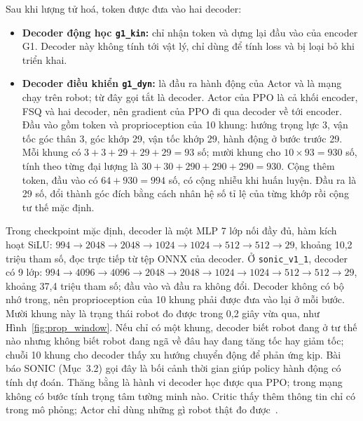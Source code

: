 \documentclass[12pt,a4paper,oneside]{report}
\newcommand{\code}[1]{\texttt{#1}}
\begin{document}
Sau khi lượng tử hoá, token được đưa vào hai decoder:
\begin{itemize}
\item \textbf{Decoder động học \code{g1\_kin}:} chỉ nhận token và dựng lại đầu vào của encoder G1. Decoder này không tính tới vật lý, chỉ dùng để tính loss và bị loại bỏ khi triển khai.
\item \textbf{Decoder điều khiển \code{g1\_dyn}:} là đầu ra hành động của Actor và là mạng chạy trên robot; từ đây gọi tắt là decoder. Actor của PPO là cả khối encoder, FSQ và hai decoder, nên gradient của PPO đi qua decoder về tới encoder. Đầu vào gồm token và proprioception của 10 khung: hướng trọng lực 3, vận tốc góc thân 3, góc khớp 29, vận tốc khớp 29, hành động ở bước trước 29. Mỗi khung có $3 + 3 + 29 + 29 + 29 = 93$ số; mười khung cho $10 \times 93 = 930$ số, tính theo từng đại lượng là $30 + 30 + 290 + 290 + 290 = 930$. Cộng thêm token, đầu vào có $64 + 930 = 994$ số, có cộng nhiễu khi huấn luyện. Đầu ra là 29 số, đổi thành góc đích bằng cách nhân hệ số tỉ lệ của từng khớp rồi cộng tư thế mặc định.
\end{itemize}

Trong checkpoint mặc định, decoder là một MLP 7 lớp nối đầy đủ, hàm kích hoạt SiLU: $994 \to 2048 \to 2048 \to 1024 \to 1024 \to 512 \to 512 \to 29$, khoảng 10,2 triệu tham số, đọc trực tiếp từ tệp ONNX của decoder. Ở \code{sonic\_v1\_1}, decoder có 9 lớp: $994 \to 4096 \to 4096 \to 2048 \to 2048 \to 1024 \to 1024 \to 512 \to 512 \to 29$, khoảng 37,4 triệu tham số; đầu vào và đầu ra không đổi. Decoder không có bộ nhớ trong, nên proprioception của 10 khung phải được đưa vào lại ở mỗi bước. Mười khung này là trạng thái robot đo được trong 0,2 giây vừa qua, như Hình~\ref{fig:prop_window}. Nếu chỉ có một khung, decoder biết robot đang ở tư thế nào nhưng không biết robot đang ngã về đâu hay đang tăng tốc hay giảm tốc; chuỗi 10 khung cho decoder thấy xu hướng chuyển động để phản ứng kịp. Bài báo SONIC (Mục~3.2) gọi đây là bối cảnh thời gian giúp policy hành động có tính dự đoán. Thăng bằng là hành vi decoder học được qua PPO; trong mạng không có bước tính trọng tâm tường minh nào. Critic thấy thêm thông tin chỉ có trong mô phỏng; Actor chỉ dùng những gì robot thật đo được~\cite{asymac}.
\end{document}
